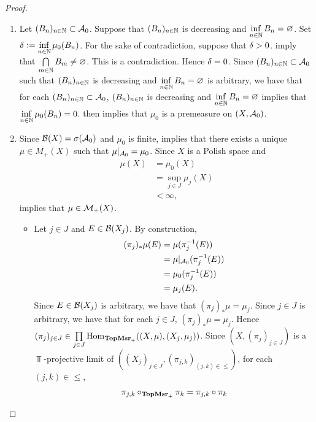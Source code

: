 \documentclass{book}
\begin{document}
\begin{proof}
\begin{enumerate}
\begin{enumerate}
		\end{enumerate} 
		\item Let $(B_n)_{n \in \mathbb{N}} \subset \mathcal{A}_0$. Suppose that $(B_n)_{n \in \mathbb{N}}$ is decreasing and $\inf\limits_{n \in \mathbb{N}} B_n = \varnothing$. Set $\delta \vcentcolon= \inf\limits_{n \in \mathbb{N}} \mu_0(B_n)$. For the sake of contradiction, suppose that $\delta > 0$.  imply that $\bigcap\limits_{m \in \mathbb{N}} B_m \neq \varnothing$. This is a contradiction. Hence $\delta = 0$. Since $(B_n)_{n \in \mathbb{N}} \subset \mathcal{A}_0$ such that $(B_n)_{n \in \mathbb{N}}$ is decreasing and $\inf\limits_{n \in \mathbb{N}} B_n = \varnothing$ is arbitrary, we have that for each $(B_n)_{n \in \mathbb{N}} \subset \mathcal{A}_0$, $(B_n)_{n \in \mathbb{N}}$ is decreasing and $\inf\limits_{n \in \mathbb{N}} B_n = \varnothing$ implies that $\inf\limits_{n \in \mathbb{N}} \mu_0(B_n) = 0$.  then implies that $\mu_0$ is a premeasure on $(X, \mathcal{A}_0)$. 
		\item Since $\mathcal{B}(X) = \sigma(\mathcal{A}_0)$ and $\mu_0$ is finite,  implies that there exists a unique $\mu \in M_+(X)$ such that $\mu|_{\mathcal{A}_0} = \mu_0$. Since $X$ is a Polish space  and 
		\begin{align*}
			\mu(X)
			& = \mu_0(X) \\
			& = \sup\limits_{j \in J} \mu_j(X) \\
			& < \infty, 
		\end{align*}
		\rex{}  implies that $\mu \in \mathcal{M}_+(X)$.
		\begin{itemize}
			\item Let $j \in J$ and $E \in \mathcal{B}(X_j)$. By construction, 
			\begin{align*}
				(\pi_j)_*\mu(E)
				& = \mu(\pi_j^{-1}(E)) \\
				& = \mu|_{\mathcal{A}_0}(\pi_j^{-1}(E)) \\
				& = \mu_0(\pi_j^{-1}(E)) \\
				& = \mu_j(E).
			\end{align*}
			Since $E \in \mathcal{B}(X_j)$ is arbitrary, we have that $(\pi_j)_*\mu = \mu_j$. Since $j \in J$ is arbitrary, we have that for each $j \in J$, $(\pi_j)_*\mu = \mu_j$. Hence $(\pi_j)_{j \in J} \in \prod\limits_{j \in J} \operatorname{Hom}_{\operatorname*{\text{\textbf{TopMsr}}_{+}}}((X, \mu), (X_j, \mu_j))$. Since $(X, (\pi_j)_{j \in J})$ is a $\Top$-projective limit of $((X_j)_{j \in J}, (\pi_{j,k})_{(j,k) \in {\leq}})$, for each $(j,k) \in {\leq}$, 
			\begin{align*}
				\pi_{j,k} \circ_{\TopMsrpos} \pi_k 
				& = \pi_{j,k} \circ \pi_k \\

\end{align*}
\end{itemize}
\end{enumerate}
\end{proof}
\end{document}
